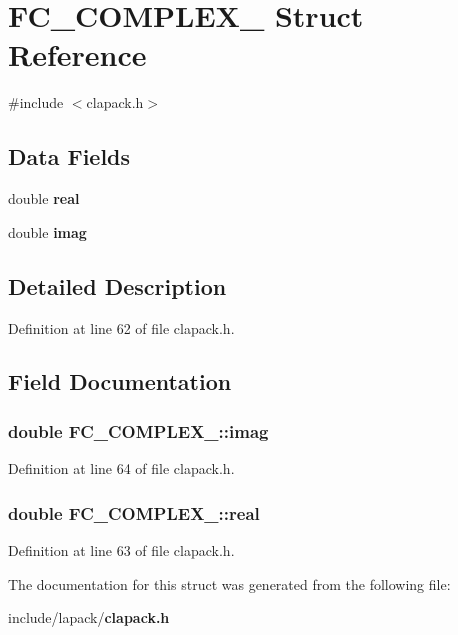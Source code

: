 \section{F\-C\-\_\-\-C\-O\-M\-P\-L\-E\-X\-\_ Struct Reference}
\label{d5/d95/structFC__COMPLEX__16}


{\ttfamily \#include $<$clapack.\-h$>$}

\subsection*{Data Fields}
\begin{DoxyCompactItemize}
\item 
double {\bf real}
\item 
double {\bf imag}
\end{DoxyCompactItemize}


\subsection{Detailed Description}


Definition at line 62 of file clapack.\-h.



\subsection{Field Documentation}
\subsubsection[{imag}]{\setlength{\rightskip}{0pt plus 5cm}double F\-C\-\_\-\-C\-O\-M\-P\-L\-E\-X\-\_\-::imag}\label{d5/d95/structFC__COMPLEX__16_a075588e4bbfd14523ef91f3d2eb460b4}


Definition at line 64 of file clapack.\-h.

\subsubsection[{real}]{\setlength{\rightskip}{0pt plus 5cm}double F\-C\-\_\-\-C\-O\-M\-P\-L\-E\-X\-\_\-::real}\label{d5/d95/structFC__COMPLEX__16_a285e27d39a7af867d2adf465dd97c724}


Definition at line 63 of file clapack.\-h.



The documentation for this struct was generated from the following file\-:\begin{DoxyCompactItemize}
\item 
include/lapack/{\bf clapack.\-h}\end{DoxyCompactItemize}
